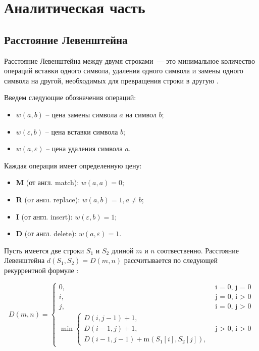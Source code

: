 \chapter{Аналитическая часть}

\section{Расстояние Левенштейна}

Расстояние Левенштейна между двумя строками~--- это минимальное количество операций вставки одного символа, удаления одного символа и замены одного символа на другой, необходимых для превращения строки в другую \cite{analysis-lev-damlev}.

Введем следующие обозначения операций:
\begin{itemize}
    \item $w(a, b)$ -- цена замены символа $a$ на символ $b$;
    \item $w(\varepsilon, b)$ – цена вставки символа $b$; 
    \item $w(a, \varepsilon)$ – цена удаления символа $a$.
\end{itemize}

Каждая операция имеет определенную цену:
\begin{itemize}
    \item \textbf{M} (от англ. match): $w(a, a) = 0$;
    \item \textbf{R} (от англ. replace): $w(a, b) = 1, a \ne b$;
    \item \textbf{I} (от англ. insert): $w(\varepsilon, b) = 1$;
    \item \textbf{D} (от англ. delete): $w(a, \varepsilon) = 1$.
\end{itemize}

Пусть имеется две строки $S_1$ и $S_2$ длиной $m$ и $n$ соотвественно.
Расстояние Левенштейна $d(S_1, S_2) = D(m, n)$ рассчитывается по следующей рекуррентной формуле \cite{prog-impl-lev}:

\begin{equation}
    \label{eqn:recur-lev}
    D(m, n) =
    \begin{cases}
        0, &\text{i = 0, j = 0}\\
        i, &\text{j = 0, i > 0}\\
        j, &\text{i = 0, j > 0}\\
        \min
        \begin{cases}
            D(i, j - 1) + 1,\\
            D(i - 1, j) + 1,\\
            D(i - 1, j - 1) + \text{m}(S_1[i], S_2[j]),
        \end{cases} &\text{j > 0, i > 0}
    \end{cases}
\end{equation}

